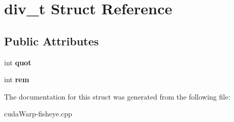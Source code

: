 \hypertarget{structdiv__t}{}\section{div\+\_\+t Struct Reference}
\label{structdiv__t}
\subsection*{Public Attributes}
\begin{DoxyCompactItemize}
\item 
int {\bfseries quot}\hypertarget{structdiv__t_a0b9dda2884048daa68ca4aaa12b17b9a}{}\label{structdiv__t_a0b9dda2884048daa68ca4aaa12b17b9a}

\item 
int {\bfseries rem}\hypertarget{structdiv__t_ac64389de252de53eda8b4f8dbb7c623f}{}\label{structdiv__t_ac64389de252de53eda8b4f8dbb7c623f}

\end{DoxyCompactItemize}


The documentation for this struct was generated from the following file\+:\begin{DoxyCompactItemize}
\item 
cuda\+Warp-\/fisheye.\+cpp\end{DoxyCompactItemize}
